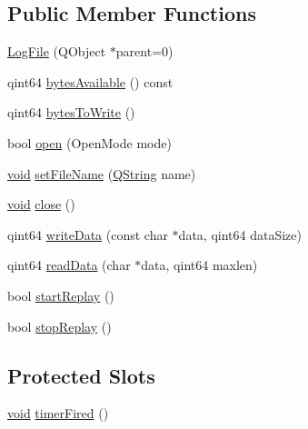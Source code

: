 \subsection*{\-Public \-Member \-Functions}
\begin{DoxyCompactItemize}
\item 
\hyperlink{class_log_file_a7a1cbbcbd9207aff498200f43afc000b}{\-Log\-File} (\-Q\-Object $\ast$parent=0)
\item 
qint64 \hyperlink{class_log_file_a9b005cee5c39390f3bfd483169dd61fa}{bytes\-Available} () const 
\item 
qint64 \hyperlink{class_log_file_afcd2cad8d846a73b1f4a82115d7eacd4}{bytes\-To\-Write} ()
\item 
bool \hyperlink{class_log_file_ad517c5a30953ceec11b5eac1d83d4d3d}{open} (\-Open\-Mode mode)
\item 
\hyperlink{group___u_a_v_objects_plugin_ga444cf2ff3f0ecbe028adce838d373f5c}{void} \hyperlink{class_log_file_a7e1213202ce1993e0bf6685f03abb392}{set\-File\-Name} (\hyperlink{group___u_a_v_objects_plugin_gab9d252f49c333c94a72f97ce3105a32d}{\-Q\-String} name)
\item 
\hyperlink{group___u_a_v_objects_plugin_ga444cf2ff3f0ecbe028adce838d373f5c}{void} \hyperlink{class_log_file_a562305d5cd6f15bbebf4c0ad29fb553c}{close} ()
\item 
qint64 \hyperlink{class_log_file_aeb63c036d0151089ac2fd8a8ce1596d9}{write\-Data} (const char $\ast$data, qint64 data\-Size)
\item 
qint64 \hyperlink{class_log_file_af7052808ae3c412bdcab996a8aca6b0a}{read\-Data} (char $\ast$data, qint64 maxlen)
\item 
bool \hyperlink{class_log_file_a831f8e55896d31e6bedd805a0d429dbf}{start\-Replay} ()
\item 
bool \hyperlink{class_log_file_a642df666429251c89899ddccc03d7525}{stop\-Replay} ()
\end{DoxyCompactItemize}
\subsection*{\-Protected \-Slots}
\begin{DoxyCompactItemize}
\item 
\hyperlink{group___u_a_v_objects_plugin_ga444cf2ff3f0ecbe028adce838d373f5c}{void} \hyperlink{class_log_file_a7e66e2f2b6fc330107d8a87e045cd1fd}{timer\-Fired} ()
\end{DoxyCompactItemize}
